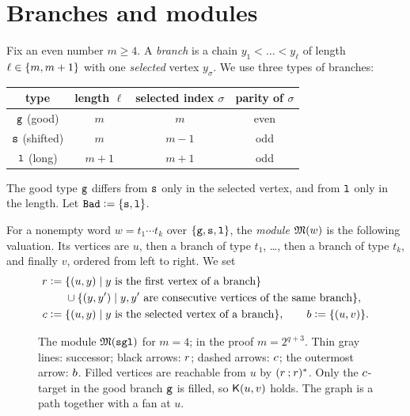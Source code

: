 \section{Branches and modules}\label{section: modules}

Fix an even number $m \ge 4$.
A \emph{branch} is a chain $y_1 < \dots < y_\ell$ of length $\ell \in \{m, m+1\}$ with one \emph{selected} vertex $y_\sigma$.
We use three types of branches:
\begin{center}
  \begin{tabular}{cccc}
    type & length $\ell$ & selected index $\sigma$ & parity of $\sigma$ \\ \hline
    $\mathtt{g}$ (good)    & $m$   & $m$   & even \\
    $\mathtt{s}$ (shifted) & $m$   & $m-1$ & odd \\
    $\mathtt{l}$ (long)    & $m+1$ & $m+1$ & odd
  \end{tabular}
\end{center}
The good type $\mathtt{g}$ differs from $\mathtt{s}$ only in the selected vertex, and from $\mathtt{l}$ only in the length.
Let $\mathtt{Bad} \mathrel{\vcentcolon=} \{\mathtt{s}, \mathtt{l}\}$.

\begin{definition}[Modules]\label{definition: module}
  For a nonempty word $w = t_1 \cdots t_k$ over $\{\mathtt{g}, \mathtt{s}, \mathtt{l}\}$, the \emph{module} $\mathfrak{M}(w)$ is the following valuation.
  Its vertices are $u$, then a branch of type $t_1$, \dots, then a branch of type $t_k$, and finally $v$, ordered from left to right.
  We set
  \begin{align*}
    \vr &\defeq \set{(u, y) \mid y \text{ is the first vertex of a branch}}\\
        &\phantom{{}\defeq{}} \union \set{(y, y') \mid y, y' \text{ are consecutive vertices of the same branch}},\\
    \vc &\defeq \set{(u, y) \mid y \text{ is the selected vertex of a branch}},
    \qquad
    \vb \defeq \set{(u, v)}.
  \end{align*}
\end{definition}

\begin{figure}[t]
  \centering
  
  \caption{The module $\mathfrak{M}(\mathtt{s}\mathtt{g}\mathtt{l})$ for $m = 4$; in the proof $m = 2^{q+3}$.
    Thin gray lines: successor; black arrows: $r$; dashed arrows: $c$; the outermost arrow: $b$.
    Filled vertices are reachable from $u$ by $(r \mathbin{;} r)^{*}$.
    Only the $c$-target in the good branch $\mathtt{g}$ is filled, so $\mathsf{K}(u, v)$ holds.
    The graph is a path together with a fan at $u$.}
  \label{figure: module}
\end{figure}

